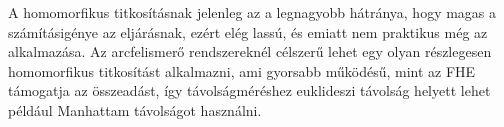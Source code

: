 A homomorfikus titkosításnak jelenleg az a legnagyobb hátránya, hogy magas a számításigénye az eljárásnak, ezért elég lassú, és emiatt nem praktikus még az alkalmazása. Az arcfelismerő rendszereknél célszerű lehet egy olyan részlegesen homomorfikus titkosítást alkalmazni, ami gyorsabb működésű, mint az FHE támogatja az összeadást, így távolságméréshez euklideszi távolság helyett lehet például Manhattam távolságot használni.





